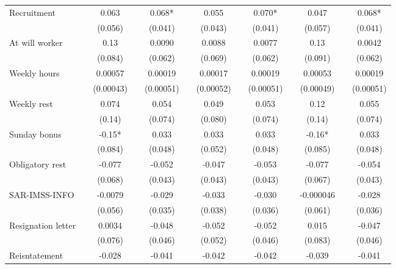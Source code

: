 \begin{tabular}{lcccccccccccc}
Recruitment &       & 0.063 &       & 0.068* &       & 0.055 &       & 0.070* &       & 0.047 &       & 0.068* \\
      &       & (0.056) &       & (0.041) &       & (0.043) &       & (0.041) &       & (0.057) &       & (0.041) \\
At will worker &       & 0.13  &       & 0.0090 &       & 0.0088 &       & 0.0077 &       & 0.13  &       & 0.0042 \\
      &       & (0.084) &       & (0.062) &       & (0.069) &       & (0.062) &       & (0.091) &       & (0.062) \\
Weekly hours &       & 0.00057 &       & 0.00019 &       & 0.00017 &       & 0.00019 &       & 0.00053 &       & 0.00019 \\
      &       & (0.00043) &       & (0.00051) &       & (0.00052) &       & (0.00051) &       & (0.00049) &       & (0.00051) \\
Weekly rest &       & 0.074 &       & 0.054 &       & 0.049 &       & 0.053 &       & 0.12  &       & 0.055 \\
      &       & (0.14) &       & (0.074) &       & (0.080) &       & (0.074) &       & (0.14) &       & (0.074) \\
Sunday bonus &       & -0.15* &       & 0.033 &       & 0.033 &       & 0.033 &       & -0.16* &       & 0.033 \\
      &       & (0.084) &       & (0.048) &       & (0.052) &       & (0.048) &       & (0.085) &       & (0.048) \\
Obligatory rest &       & -0.077 &       & -0.052 &       & -0.047 &       & -0.053 &       & -0.077 &       & -0.054 \\
      &       & (0.068) &       & (0.043) &       & (0.043) &       & (0.043) &       & (0.067) &       & (0.043) \\
SAR-IMSS-INFO &       & -0.0079 &       & -0.029 &       & -0.033 &       & -0.030 &       & -0.000046 &       & -0.028 \\
      &       & (0.056) &       & (0.035) &       & (0.038) &       & (0.036) &       & (0.061) &       & (0.036) \\
Resignation letter &       & 0.0034 &       & -0.048 &       & -0.052 &       & -0.052 &       & 0.015 &       & -0.047 \\
      &       & (0.076) &       & (0.046) &       & (0.052) &       & (0.046) &       & (0.083) &       & (0.046) \\
Reisntatement &       & -0.028 &       & -0.041 &       & -0.042 &       & -0.042 &       & -0.039 &       & -0.041 \\

\end{tabular}
